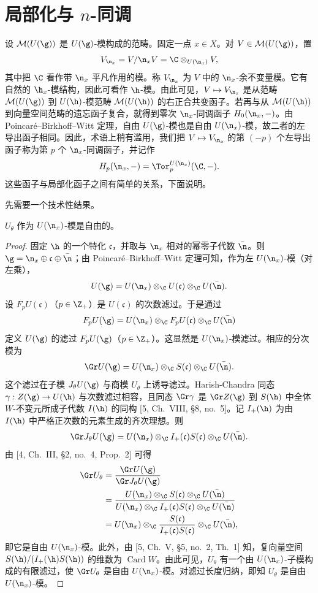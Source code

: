 \section{局部化与 $n$-同调}
\label{sec:03.3.2}

设 $\mathcal{M}(U(\g))$ 是 $U(\g)$-模构成的范畴。固定一点 $x\in X$。对 $V\in\mathcal{M}(U(\g))$，置
$$V_{\n_x}=V/\n_xV=\C\otimes_{U(\n_x)}V,$$
其中把 $\C$ 看作带 $\n_x$ 平凡作用的模。称 $V_{\n_x}$ 为 $V$ 中的 $\n_x$-余不变量模。它有自然的 $\h_x$-模结构，因此可看作 $\h$-模。由此可见，$V\mapsto V_{\n_x}$ 是从范畴 $\mathcal{M}(U(\g))$ 到 $U(\h)$-模范畴 $\mathcal{M}(U(\h))$ 的右正合共变函子。若再与从 $\mathcal{M}(U(\h))$ 到向量空间范畴的遗忘函子复合，就得到零次 $\n_x$-同调函子 $H_0(\n_x,-)$。由 Poincaré--Birkhoff--Witt 定理，自由 $U(\g)$-模也是自由 $U(\n_x)$-模，故二者的左导出函子相同。因此，术语上稍有滥用，我们把 $V\mapsto V_{\n_x}$ 的第 $(-p)$ 个左导出函子称为第 $p$ 个 $\n_x$-同调函子，并记作
$$H_p(\n_x,-)=\Tor_p^{U(\n_x)}(\C,-).$$
这些函子与局部化函子之间有简单的关系，下面说明。

先需要一个技术性结果。

\begin{lemma}\label{lem:03.2.1}
$U_\theta$ 作为 $U(\n_x)$-模是自由的。
\end{lemma}

\begin{proof}
固定 $\h$ 的一个特化 $\mathfrak{c}$，并取与 $\n_x$ 相对的幂零子代数 $\bar{\n}$。则 $\g=\n_x\oplus\mathfrak{c}\oplus\bar{\n}$；由 Poincaré--Birkhoff--Witt 定理可知，作为左 $U(\n_x)$-模（对左乘），
$$U(\g)=U(\n_x)\otimes_\C U(\mathfrak{c})\otimes_\C U(\bar{\n}).$$
设 $F_pU(\mathfrak{c})$（$p\in\Z_+$）是 $U(\mathfrak{c})$ 的次数滤过。于是通过
$$F_pU(\g)=U(\n_x)\otimes_\C F_pU(\mathfrak{c})\otimes_\C U(\bar{\n})$$
定义 $U(\g)$ 的滤过 $F_pU(\g)$（$p\in\Z_+$）。这显然是 $U(\n_x)$-模滤过。相应的分次模为
$$\Gr U(\g)=U(\n_x)\otimes_\C S(\mathfrak{c})\otimes_\C U(\bar{\n}).$$
这个滤过在子模 $J_\theta U(\g)$ 与商模 $U_\theta$ 上诱导滤过。Harish-Chandra 同态 $\gamma:Z(\g)\to U(\h)$ 与次数滤过相容，且同态 $\Gr\gamma$ 是 $\Gr Z(\g)$ 到 $S(\h)$ 中全体 $W$-不变元所成子代数 $I(\h)$ 的同构 [5, Ch.~VIII, \S8, no.~5]。记 $I_+(\h)$ 为由 $I(\h)$ 中严格正次数的元素生成的齐次理想。则
$$\Gr J_\theta U(\g)=U(\n_x)\otimes_\C I_+(\mathfrak{c})S(\mathfrak{c})\otimes_\C U(\bar{\n}).$$
由 [4, Ch.~III, \S2, no.~4, Prop.~2] 可得
\begin{align*}
\Gr U_\theta&=\frac{\Gr U(\g)}{\Gr J_\theta U(\g)}\\
&=\frac{U(\n_x)\otimes_\C S(\mathfrak{c})\otimes_\C U(\bar{\n})}
{U(\n_x)\otimes_\C I_+(\mathfrak{c})S(\mathfrak{c})\otimes_\C U(\bar{\n})}\\
&=U(\n_x)\otimes_\C\frac{S(\mathfrak{c})}{I_+(\mathfrak{c})S(\mathfrak{c})}\otimes_\C U(\bar{\n}),
\end{align*}
即它是自由 $U(\n_x)$-模。此外，由 [5, Ch.~V, \S5, no.~2, Th.~1] 知，复向量空间 $S(\h)/(I_+(\h)S(\h))$ 的维数为 $\operatorname{Card}W$。由此可见，$U_\theta$ 有一个由 $U(\n_x)$-子模构成的有限滤过，使 $\Gr U_\theta$ 是自由 $U(\n_x)$-模。对滤过长度归纳，即知 $U_\theta$ 是自由 $U(\n_x)$-模。
\end{proof}

